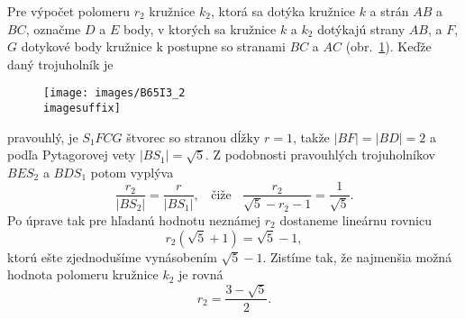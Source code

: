 {Pre výpočet polomeru $r_2$ kružnice $k_2$, ktorá sa dotýka kružnice $k$ a strán $AB$ a $BC$, označme $D$ a $E$ body, v ktorých sa kružnice $k$ a $k_2$ dotýkajú strany $AB$, a $F$, $G$ dotykové body kružnice k postupne so stranami $BC$ a $AC$ (obr.~\ref{fig:B65I3_2}). Keďže daný trojuholník je
\begin{figure}[h]
    \centering
    \texttt{[image: images/B65I3\_2\\imagesuffix]}
    \caption{}
    \label{fig:B65I3_2}
\end{figure}
pravouhlý, je $S_1FCG$ štvorec so stranou dĺžky $r = 1$, takže $|BF| = |BD| = 2$ a podľa Pytagorovej vety $|BS_1| =\sqrt{5}$. Z podobnosti pravouhlých trojuholníkov $BES_2$ a $BDS_1$ potom vyplýva
$$\frac{r_2}{|BS_2|}=\frac{r}{|BS_1|}, \ \ \ \ \text{čiže} \ \ \ \ \frac{r_2}{\sqrt{5}- r_2 - 1}=\frac{1}{\sqrt{5}}.$$
Po úprave tak pre hľadanú hodnotu neznámej $r_2$ dostaneme lineárnu rovnicu
$$r_2(\sqrt{5} + 1) =\sqrt{5}-1,$$
ktorú ešte zjednodušíme vynásobením $\sqrt{5}-1$. Zistíme tak, že najmenšia možná hodnota polomeru kružnice $k_2$ je rovná $$r_2 = \frac{3-\sqrt{5}}{2}.$$
}
